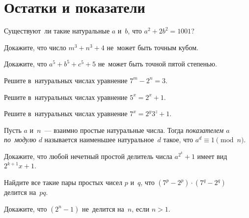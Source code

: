 
\section*{Остатки и показатели}


\begin{problems}

\item
Существуют~ли такие натуральные $a$ и~$b$, что $a^2 + 2 b^2 = 1001$?

\item
Докажите, что число $m^3 + n^3 + 4$ не~может быть точным кубом.

\item
Докажите, что $a^5 + b^5 + c^5 + 5$ не~может быть точной пятой степенью.

\item
Решите в~натуральных числах уравнение $7^m - 2^n = 3$.

\item
Решите в~натуральных числах уравнение $5^x = 2^x + 1$.

\item
Решите в~натуральных числах уравнение $7^x = 2^y 3^z + 1$.

\end{problems}

Пусть $a$ и~$n$~--- взаимно простые натуральные числа.
Тогда \emph{показателем $a$ по~модулю $d$} называется наименьшее
натуральное~$d$ такое, что $a^d \equiv 1 \pmod{n}$.

\begin{problems}

\item
Докажите, что любой нечетный простой делитель числа $a^{2^k} + 1$ имеет вид
$2^{k+1} x + 1$.

\item
Найдите все такие пары простых чисел $p$ и~$q$, что
$(7^{p} - 2^{p}) \cdot (7^{q} - 2^{q})$ делится на~$p q$.

\item
Докажите, что $(2^n - 1)$ не~делится на~$n$, если $n > 1$.


\end{problems}

